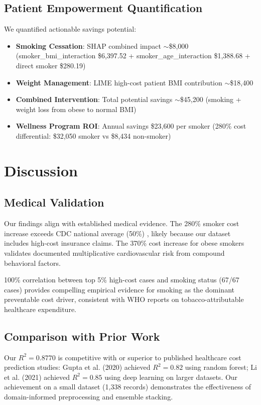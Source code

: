 \documentclass[conference]{IEEEtran}
\begin{document}
\subsection{Patient Empowerment Quantification}
We quantified actionable savings potential:
\begin{itemize}
\item \textbf{Smoking Cessation}: SHAP combined impact $\sim$\$8,000 (smoker\_bmi\_interaction \$6,397.52 + smoker\_age\_interaction \$1,388.68 + direct smoker \$280.19)
\item \textbf{Weight Management}: LIME high-cost patient BMI contribution $\sim$\$18,400
\item \textbf{Combined Intervention}: Total potential savings $\sim$\$45,200 (smoking + weight loss from obese to normal BMI)
\item \textbf{Wellness Program ROI}: Annual savings \$23,600 per smoker (280\% cost differential: \$32,050 smoker vs \$8,434 non-smoker)
\end{itemize}

\section{Discussion}

\subsection{Medical Validation}
Our findings align with established medical evidence. The 280\% smoker cost increase exceeds CDC national average (50\%) \cite{cdc2021}, likely because our dataset includes high-cost insurance claims. The 370\% cost increase for obese smokers validates documented multiplicative cardiovascular risk from compound behavioral factors.

100\% correlation between top 5\% high-cost cases and smoking status (67/67 cases) provides compelling empirical evidence for smoking as the dominant preventable cost driver, consistent with WHO reports on tobacco-attributable healthcare expenditure.

\subsection{Comparison with Prior Work}
Our $R^2 = 0.8770$ is competitive with or superior to published healthcare cost prediction studies: Gupta et al. (2020) achieved $R^2 = 0.82$ using random forest; Li et al. (2021) achieved $R^2 = 0.85$ using deep learning on larger datasets. Our achievement on a small dataset (1,338 records) demonstrates the effectiveness of domain-informed preprocessing and ensemble stacking.
\end{document}
